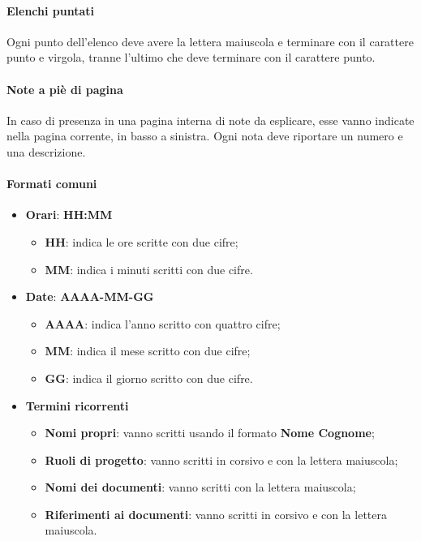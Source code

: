 \paragraph{Elenchi puntati} \Spazio
	Ogni punto dell'elenco deve avere la lettera maiuscola e terminare con il carattere punto e virgola, tranne l'ultimo che deve terminare con il carattere punto.

\paragraph{Note a piè di pagina} \Spazio
In caso di presenza in una pagina interna di note da esplicare, esse vanno indicate nella pagina corrente, in basso a sinistra. Ogni nota deve riportare un numero e una descrizione.

\paragraph{Formati comuni}
\begin{itemize}
	\item \textbf{Orari}: \textbf{HH:MM}
	\begin{itemize}
		\item \textbf{HH}: indica le ore scritte con due cifre;
		\item \textbf{MM}: indica i minuti scritti con due cifre.
	\end{itemize}
	\item \textbf{Date}: \textbf{AAAA-MM-GG}
	\begin{itemize}
		\item \textbf{AAAA}: indica l'anno scritto con quattro cifre;
		\item \textbf{MM}: indica il mese scritto con due cifre;
		\item \textbf{GG}: indica il giorno scritto con due cifre.
	\end{itemize}
	\item \textbf{Termini ricorrenti}
	\begin{itemize}
		\item \textbf{Nomi propri}: vanno scritti usando il formato \textbf{Nome Cognome};
		\item \textbf{Ruoli di progetto}: vanno scritti in corsivo e con la lettera maiuscola;
		\item \textbf{Nomi dei documenti}: vanno scritti con la lettera maiuscola;
		\item \textbf{Riferimenti ai documenti}: vanno scritti in corsivo e con la lettera maiuscola.
	\end{itemize}
\end{itemize}

